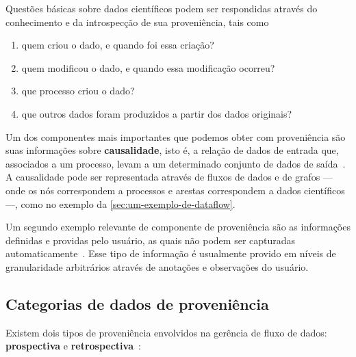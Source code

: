 Questões básicas sobre dados científicos podem ser respondidas através do conhecimento e da introspecção de sua proveniência, tais como

\begin{enumerate}
    \item quem criou o dado, e quando foi essa criação?
    \item quem modificou o dado, e quando essa modificação ocorreu?
    \item que processo criou o dado?
    \item que outros dados foram produzidos a partir dos dados originais?
\end{enumerate}

Um dos componentes mais importantes que podemos obter com proveniência são suas informações sobre \textbf{causalidade}, isto é, a relação de dados de entrada que, associados a um processo, levam a um determinado conjunto de dados de saída~\cite{freire2008provenance}. A causalidade pode ser representada através de fluxos de dados e de grafos --- onde os nós correspondem a processos e arestas correspondem a dados científicos ---, como no exemplo da \autoref{sec:um-exemplo-de-dataflow}.

Um segundo exemplo relevante de componente de proveniência são as informações definidas e providas pelo usuário, as quais não podem ser capturadas automaticamente~\cite{freire2008provenance}. Esse tipo de informação é usualmente provido em níveis de granularidade arbitrários através de anotações e observações do usuário.

\subsection{Categorias de dados de proveniência}

Existem dois tipos de proveniência envolvidos na gerência de fluxo de dados: \textbf{prospectiva} e \textbf{retrospectiva}~\cite{murta2014noworkflow,freire2008provenance}:

